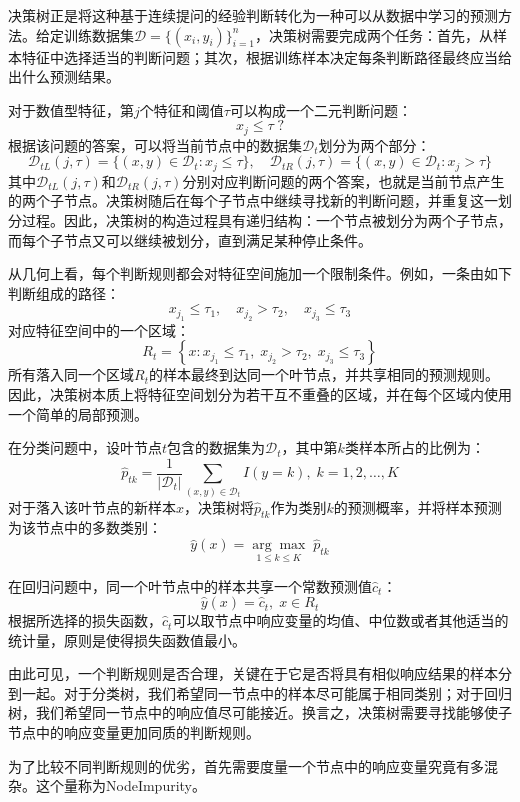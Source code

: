 决策树正是将这种基于连续提问的经验判断转化为一种可以从数据中学习的预测方法。给定训练数据集$\mathcal{D}=\{(x_i,y_i)\}_{i=1}^{n}$，决策树需要完成两个任务：首先，从样本特征中选择适当的判断问题；其次，根据训练样本决定每条判断路径最终应当给出什么预测结果。\par
对于数值型特征，第$j$个特征和阈值$\tau$可以构成一个二元判断问题：
\begin{equation*}
	x_j\leqslant\tau\;?
\end{equation*}
根据该问题的答案，可以将当前节点中的数据集$\mathcal{D}_t$划分为两个部分：
\begin{equation*}
	\mathcal{D}_{tL}(j,\tau)=\{(x,y)\in\mathcal{D}_t:x_j\leqslant\tau\},\quad\mathcal{D}_{tR}(j,\tau)=\{(x,y)\in\mathcal{D}_t:x_j>\tau\}
\end{equation*}
其中$\mathcal{D}_{tL}(j,\tau)$和$\mathcal{D}_{tR}(j,\tau)$分别对应判断问题的两个答案，也就是当前节点产生的两个子节点。决策树随后在每个子节点中继续寻找新的判断问题，并重复这一划分过程。因此，决策树的构造过程具有递归结构：一个节点被划分为两个子节点，而每个子节点又可以继续被划分，直到满足某种停止条件。\par
从几何上看，每个判断规则都会对特征空间施加一个限制条件。例如，一条由如下判断组成的路径：
\begin{equation*}
	x_{j_1}\leqslant\tau_1,\quad x_{j_2}>\tau_2,\quad x_{j_3}\leqslant\tau_3
\end{equation*}
对应特征空间中的一个区域：
\begin{equation*}
	R_t=\left\{x:x_{j_1}\leqslant\tau_1,\;x_{j_2}>\tau_2,\;x_{j_3}\leqslant\tau_3\right\}
\end{equation*}
所有落入同一个区域$R_t$的样本最终到达同一个叶节点，并共享相同的预测规则。因此，决策树本质上将特征空间划分为若干互不重叠的区域，并在每个区域内使用一个简单的局部预测。\par
在分类问题中，设叶节点$t$包含的数据集为$\mathcal{D}_t$，其中第$k$类样本所占的比例为：
\begin{equation*}
	\hat{p}_{tk}=\frac{1}{|\mathcal{D}_t|}\sum_{(x,y)\in\mathcal{D}_t}I(y=k),\;k=1,2,\dots,K
\end{equation*}
对于落入该叶节点的新样本$x$，决策树将$\hat{p}_{tk}$作为类别$k$的预测概率，并将样本预测为该节点中的多数类别：
\begin{equation*}
	\hat{y}(x)=\underset{1\leqslant k\leqslant K}{\arg\max}\;\hat{p}_{tk}
\end{equation*}\par
在回归问题中，同一个叶节点中的样本共享一个常数预测值$\hat{c}_t$：
\begin{equation*}
	\hat{y}(x)=\hat{c}_t,\;x\in R_t
\end{equation*}
根据所选择的损失函数，$\hat{c}_t$可以取节点中响应变量的均值、中位数或者其他适当的统计量，原则是使得损失函数值最小。\par
由此可见，一个判断规则是否合理，关键在于它是否将具有相似响应结果的样本分到一起。对于分类树，我们希望同一节点中的样本尽可能属于相同类别；对于回归树，我们希望同一节点中的响应值尽可能接近。换言之，决策树需要寻找能够使子节点中的响应变量更加同质的判断规则。\par
为了比较不同判断规则的优劣，首先需要度量一个节点中的响应变量究竟有多混杂。这个量称为\gls{NodeImpurity}。
